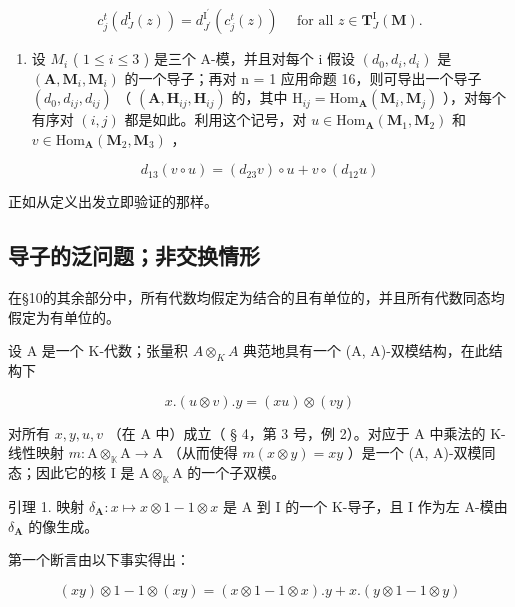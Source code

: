 \[
c _ {j} ^ {t} (d _ {J} ^ {\mathrm{I}} (z)) = d _ {J ^ {\prime}} ^ {\mathrm{I} ^ {\prime}} (c _ {j} ^ {t} (z)) \quad \text { for   all } z \in \mathbf {T} _ {J} ^ {\mathrm{I}} (\mathbf {M}).
\]

\begin{enumerate}
\def\labelenumi{(\arabic{enumi})}
\setcounter{enumi}{3}
\tightlist
\item
  设 \(M_{i}\) ( \(1 \leqslant i \leqslant 3\) ) 是三个 A-模，并且对每个 i 假设 \((d_{0}, d_{i}, d_{i})\) 是 \((\mathbf{A}, \mathbf{M}_{i}, \mathbf{M}_{i})\) 的一个导子；再对 n = 1 应用命题 16，则可导出一个导子 \((d_{0}, d_{ij}, d_{ij})\) （ \((\mathbf{A}, \mathbf{H}_{ij}, \mathbf{H}_{ij})\) 的，其中 \(\mathrm{H}_{ij} = \mathrm{Hom}_{\mathbf{A}}(\mathbf{M}_{i}, \mathbf{M}_{j})\) ），对每个有序对 \((i, j)\) 都是如此。利用这个记号，对 \(u \in \mathrm{Hom}_{\mathbf{A}}(\mathbf{M}_{1}, \mathbf{M}_{2})\) 和 \(v \in \mathrm{Hom}_{\mathbf{A}}(\mathbf{M}_{2}, \mathbf{M}_{3})\) ，
\end{enumerate}

\[
d _ {1 3} (v \circ u) = (d _ {2 3} v) \circ u + v \circ (d _ {1 2} u)\tag{39}
\]

正如从定义出发立即验证的那样。

\subsection{导子的泛问题；非交换情形}

在§10的其余部分中，所有代数均假定为结合的且有单位的，并且所有代数同态均假定为有单位的。

设 A 是一个 K-代数；张量积 \(A \otimes_{K} A\) 典范地具有一个 (A, A)-双模结构，在此结构下

\[
x. (u \otimes v). y = (x u) \otimes (v y)\tag{40}
\]

对所有 \(x, y, u, v\) （在 A 中）成立（ § 4，第 3 号，例 2）。对应于 A 中乘法的 K-线性映射 \(m: \mathrm{A} \otimes_{\mathbb{K}} \mathrm{A} \to \mathrm{A}\) （从而使得 \(m(x \otimes y) = xy\) ）是一个 (A, A)-双模同态；因此它的核 I 是 \(\mathrm{A} \otimes_{\mathbb{K}} \mathrm{A}\) 的一个子双模。

引理 1. 映射 \(\delta_{\mathbf{A}}: x \mapsto x \otimes 1 - 1 \otimes x\) 是 A 到 I 的一个 K-导子，且 I 作为左 A-模由 \(\delta_{\mathbf{A}}\) 的像生成。

第一个断言由以下事实得出：

\[
(x y) \otimes 1 - 1 \otimes (x y) = (x \otimes 1 - 1 \otimes x). y + x. (y \otimes 1 - 1 \otimes y)
\]


